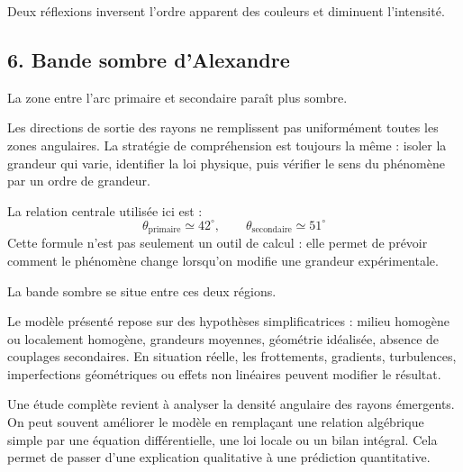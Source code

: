 \documentclass[11pt,a4paper]{article}
\begin{document}
\begin{corrigebox}[Indication]
Deux réflexions inversent l'ordre apparent des couleurs et diminuent l'intensité.
\end{corrigebox}


\subsection{6. Bande sombre d'Alexandre}

\begin{exemplebox}
La zone entre l'arc primaire et secondaire paraît plus sombre.
\end{exemplebox}

\begin{methodebox}
Les directions de sortie des rayons ne remplissent pas uniformément toutes les zones angulaires.
La stratégie de compréhension est toujours la même : isoler la grandeur qui varie, identifier la loi physique, puis vérifier le sens du phénomène par un ordre de grandeur.
\end{methodebox}

\begin{theorembox}
La relation centrale utilisée ici est :
\[
\theta_{\mathrm{primaire}}\simeq42^\circ,\qquad \theta_{\mathrm{secondaire}}\simeq51^\circ
\]
Cette formule n'est pas seulement un outil de calcul : elle permet de prévoir comment le phénomène change lorsqu'on modifie une grandeur expérimentale.
\end{theorembox}

\begin{odgbox}
La bande sombre se situe entre ces deux régions.
\end{odgbox}

\begin{attentionbox}
Le modèle présenté repose sur des hypothèses simplificatrices : milieu homogène ou localement homogène, grandeurs moyennes, géométrie idéalisée, absence de couplages secondaires. En situation réelle, les frottements, gradients, turbulences, imperfections géométriques ou effets non linéaires peuvent modifier le résultat.
\end{attentionbox}

\begin{approfondissementbox}
Une étude complète revient à analyser la densité angulaire des rayons émergents.
On peut souvent améliorer le modèle en remplaçant une relation algébrique simple par une équation différentielle, une loi locale ou un bilan intégral. Cela permet de passer d'une explication qualitative à une prédiction quantitative.
\end{approfondissementbox}
\end{document}
